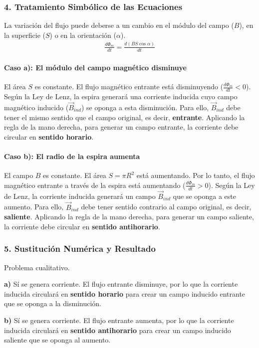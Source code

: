 \subsubsection*{4. Tratamiento Simbólico de las Ecuaciones}
La variación del flujo puede deberse a un cambio en el módulo del campo ($B$), en la superficie ($S$) o en la orientación ($\alpha$).
\begin{gather}
    \frac{d\Phi_m}{dt} = \frac{d(B S \cos\alpha)}{dt}
\end{gather}

\paragraph*{Caso a): El módulo del campo magnético disminuye}
El área $S$ es constante. El flujo magnético entrante está disminuyendo ($\frac{d\Phi_m}{dt} < 0$). Según la Ley de Lenz, la espira generará una corriente inducida cuyo campo magnético inducido ($\vec{B}_{ind}$) se oponga a esta disminución. Para ello, $\vec{B}_{ind}$ debe tener el mismo sentido que el campo original, es decir, \textbf{entrante}. Aplicando la regla de la mano derecha, para generar un campo entrante, la corriente debe circular en \textbf{sentido horario}.

\paragraph*{Caso b): El radio de la espira aumenta}
El campo $B$ es constante. El área $S = \pi R^2$ está aumentando. Por lo tanto, el flujo magnético entrante a través de la espira está aumentando ($\frac{d\Phi_m}{dt} > 0$). Según la Ley de Lenz, la corriente inducida generará un campo $\vec{B}_{ind}$ que se oponga a este aumento. Para ello, $\vec{B}_{ind}$ debe tener sentido contrario al campo original, es decir, \textbf{saliente}. Aplicando la regla de la mano derecha, para generar un campo saliente, la corriente debe circular en \textbf{sentido antihorario}.

\subsubsection*{5. Sustitución Numérica y Resultado}
Problema cualitativo.
\begin{cajaresultado}
    \textbf{a)} Sí se genera corriente. El flujo entrante disminuye, por lo que la corriente inducida circulará en \textbf{sentido horario} para crear un campo inducido entrante que se oponga a la disminución.
\end{cajaresultado}
\begin{cajaresultado}
    \textbf{b)} Sí se genera corriente. El flujo entrante aumenta, por lo que la corriente inducida circulará en \textbf{sentido antihorario} para crear un campo inducido saliente que se oponga al aumento.
\end{cajaresultado}


